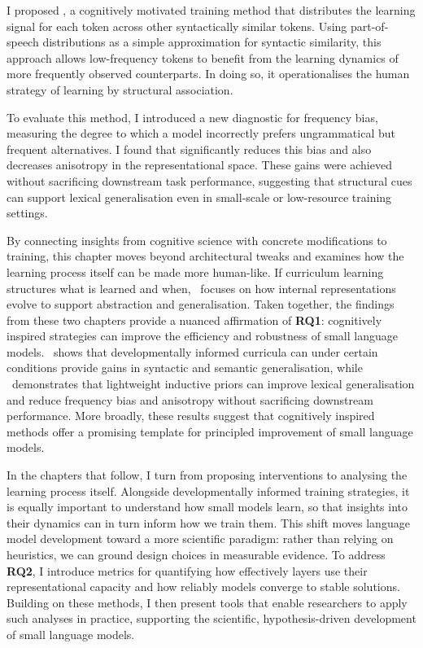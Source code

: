 I proposed \smoothing, a cognitively motivated training method that distributes the learning signal for each token across other syntactically similar tokens. Using part-of-speech distributions as a simple approximation for syntactic similarity, this approach allows low-frequency tokens to benefit from the learning dynamics of more frequently observed counterparts. In doing so, it operationalises the human strategy of learning by structural association.

To evaluate this method, I introduced a new diagnostic for frequency bias, measuring the degree to which a model incorrectly prefers ungrammatical but frequent alternatives. I found that \smoothing significantly reduces this bias and also decreases anisotropy in the representational space. These gains were achieved without sacrificing downstream task performance, suggesting that structural cues can support lexical generalisation even in small-scale or low-resource training settings.

By connecting insights from cognitive science with concrete modifications to training, this chapter moves beyond architectural tweaks and examines how the learning process itself can be made more human-like. If curriculum learning structures what is learned and when, \smoothing\ focuses on how internal representations evolve to support abstraction and generalisation. Taken together, the findings from these two chapters provide a nuanced affirmation of \textbf{RQ1}: cognitively inspired strategies can improve the efficiency and robustness of small language models. \climb\ shows that developmentally informed curricula can under certain conditions provide gains in syntactic and semantic generalisation, while \smoothing\ demonstrates that lightweight inductive priors can improve lexical generalisation and reduce frequency bias and anisotropy without sacrificing downstream performance. More broadly, these results suggest that cognitively inspired methods offer a promising template for principled improvement of small language models.

In the chapters that follow, I turn from proposing interventions to analysing the learning process itself. Alongside developmentally informed training strategies, it is equally important to understand how small models learn, so that insights into their dynamics can in turn inform how we train them. This shift moves language model development toward a more scientific paradigm: rather than relying on heuristics, we can ground design choices in measurable evidence. To address \textbf{RQ2}, I introduce metrics for quantifying how effectively layers use their representational capacity and how reliably models converge to stable solutions. Building on these methods, I then present tools that enable researchers to apply such analyses in practice, supporting the scientific, hypothesis-driven development of small language models.




